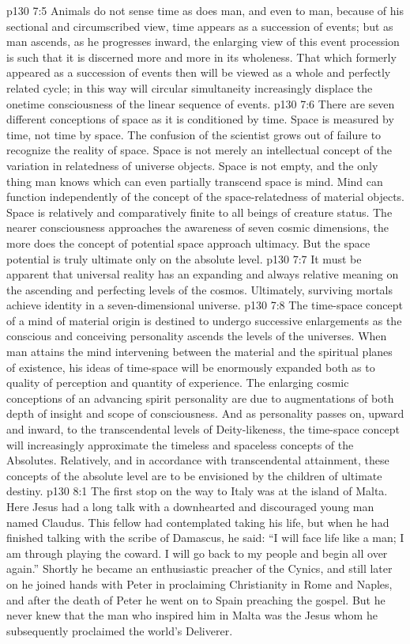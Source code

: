 \vs p130 7:5 Animals do not sense time as does man, and even to man, because of his sectional and circumscribed view, time appears as a succession of events; but as man ascends, as he progresses inward, the enlarging view of this event procession is such that it is discerned more and more in its wholeness. That which formerly appeared as a succession of events then will be viewed as a whole and perfectly related cycle; in this way will circular simultaneity increasingly displace the onetime consciousness of the linear sequence of events.
\vs p130 7:6 There are seven different conceptions of space as it is conditioned by time. Space is measured by time, not time by space. The confusion of the scientist grows out of failure to recognize the reality of space. Space is not merely an intellectual concept of the variation in relatedness of universe objects. Space is not empty, and the only thing man knows which can even partially transcend space is mind. Mind can function independently of the concept of the space\hyp{}relatedness of material objects. Space is relatively and comparatively finite to all beings of creature status. The nearer consciousness approaches the awareness of seven cosmic dimensions, the more does the concept of potential space approach ultimacy. But the space potential is truly ultimate only on the absolute level.
\vs p130 7:7 It must be apparent that universal reality has an expanding and always relative meaning on the ascending and perfecting levels of the cosmos. Ultimately, surviving mortals achieve identity in a seven\hyp{}dimensional universe.
\pc \vs p130 7:8 The time\hyp{}space concept of a mind of material origin is destined to undergo successive enlargements as the conscious and conceiving personality ascends the levels of the universes. When man attains the mind intervening between the material and the spiritual planes of existence, his ideas of time\hyp{}space will be enormously expanded both as to quality of perception and quantity of experience. The enlarging cosmic conceptions of an advancing spirit personality are due to augmentations of both depth of insight and scope of consciousness. And as personality passes on, upward and inward, to the transcendental levels of Deity\hyp{}likeness, the time\hyp{}space concept will increasingly approximate the timeless and spaceless concepts of the Absolutes. Relatively, and in accordance with transcendental attainment, these concepts of the absolute level are to be envisioned by the children of ultimate destiny.
\vs p130 8:1 The first stop on the way to Italy was at the island of Malta. Here Jesus had a long talk with a downhearted and discouraged young man named Claudus. This fellow had contemplated taking his life, but when he had finished talking with the scribe of Damascus, he said: “I will face life like a man; I am through playing the coward. I will go back to my people and begin all over again.” Shortly he became an enthusiastic preacher of the Cynics, and still later on he joined hands with Peter in proclaiming Christianity in Rome and Naples, and after the death of Peter he went on to Spain preaching the gospel. But he never knew that the man who inspired him in Malta was the Jesus whom he subsequently proclaimed the world’s Deliverer.
